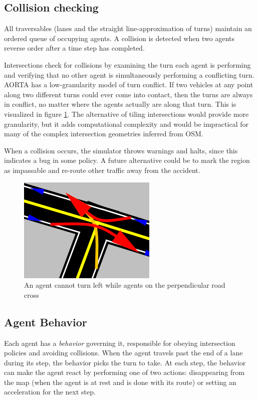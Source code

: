 \documentclass[letterpaper, 10 pt, conference]{ieeeconf}  %
\begin{document}
\subsection{Collision checking}

All traversables (lanes and the straight line-approximation of turns) maintain
an ordered queue of occupying agents. A collision is detected when two agents
reverse order after a time step has completed.

Intersections check for collisions by examining the turn each agent is
performing and verifying that no other agent is simultaneously performing a
conflicting turn. AORTA has a low-granularity model of turn conflict. If two
vehicles at any point along two different turns could ever come into contact,
then the turns are always in conflict, no matter where the agents actually are
along that turn. This is visualized in figure \ref{fig:conflicts}. The
alternative of tiling intersections \cite{JAIR08-dresner} would provide more
granularity, but it adds computational complexity and would be impractical for
many of the complex intersection geometries inferred from OSM.

When a collision occurs, the simulator throws warnings and halts, since this
indicates a bug in some policy. A future alternative could be to mark the region
as impassable and re-route other traffic away from the accident.

\begin{figure}[h]
  \centering \includegraphics[scale=0.5]{turn_conflicts.png}
  \caption{An agent cannot turn left while agents on the perpendicular road cross}
  \label{fig:conflicts}
  \vspace{-15pt}
\end{figure}

\subsection{Agent Behavior}

Each agent has a \emph{behavior} governing it, responsible for obeying
intersection policies and avoiding collisions. When the agent travels past the
end of a lane during its step, the behavior picks the turn to take. At each
step, the behavior can make the agent react by performing one of two actions:
disappearing from the map (when the agent is at rest and is done with its route)
or setting an acceleration for the next step.
\end{document}
